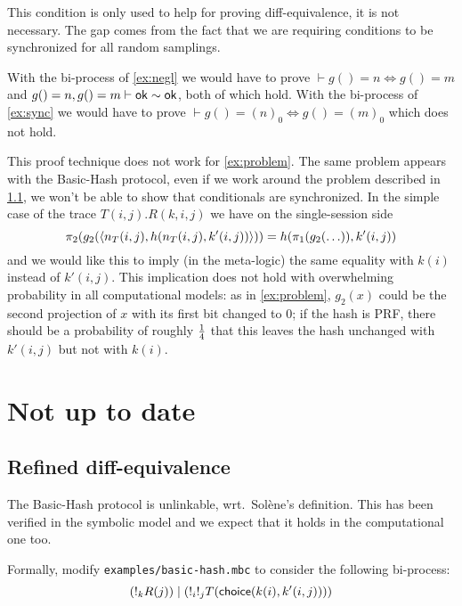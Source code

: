 This condition is only used to help for proving diff-equivalence, it is not necessary.
The gap comes from the fact that we are requiring conditions to be
synchronized for all random samplings.

\begin{example}
  With the bi-process of \cref{ex:negl} we would have to prove
  $\vdash g() = n \Leftrightarrow g() = m$ and
  $g()=n, g()=m \vdash \mathsf{ok} \sim \mathsf{ok}$, both of which hold.
  With the bi-process of \cref{ex:sync} we would have to prove
  $\vdash g() = (n)_0 \Leftrightarrow g() = (m)_0$ which does not hold.
\end{example}

\begin{example} \label{ex:indep}
  This proof technique does not work for \cref{ex:problem}.
  The same problem appears with the Basic-Hash protocol, even if we work around
the problem described in \cref{sec:refined-diff}, we won't be able to show
that conditionals are synchronized.  In the simple case of the trace
$T(i,j).R(k,i,j)$ we have
on the single-session side
$$\pi_2(g_2(\langle n_T(i,j),h(n_T(i,j),k'(i,j)) \rangle)) =
 h(\pi_1(g_2(\ldots)),k'(i,j))$$
and we would like this to imply (in the meta-logic)
the same equality with $k(i)$ instead of $k'(i,j)$.
This implication does not hold with overwhelming probability in all
computational models: as in \cref{ex:problem}, $g_2(x)$ could be the second
projection of $x$ with its first bit changed to $0$; if the hash is PRF,
there should be a probability of roughly $1 \over 4$ that this leaves
the hash unchanged with $k'(i,j)$ but not with $k(i)$.
\end{example}

\section{Not up to date}

\subsection{Refined diff-equivalence} \label{sec:refined-diff}

The Basic-Hash protocol is unlinkable, wrt.\ Solène's definition.
This has been verified in the symbolic model and we expect that it holds
in the computational one too.

Formally, modify \texttt{examples/basic-hash.mbc} to consider the
following bi-process:
$$(!_k R(j)) \mid (!_i !_j T(\mathsf{choice}(k(i),k'(i,j))))$$

